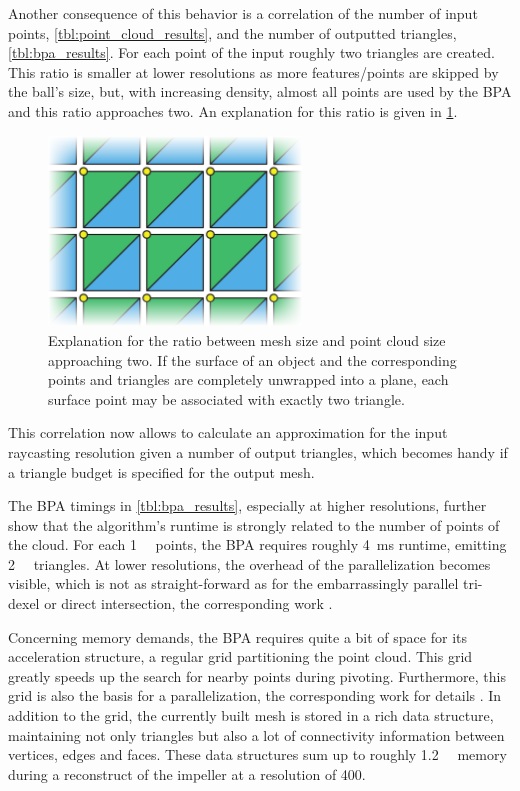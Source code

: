Another consequence of this behavior is a correlation of the number of input points, \cf \cref{tbl:point_cloud_results}, and the number of outputted triangles, \cf \cref{tbl:bpa_results}.
For each point of the input roughly two triangles are created.
This ratio is smaller at lower resolutions as more features/points are skipped by the ball's size, but, with increasing density, almost all points are used by the BPA and this ratio approaches two.
An explanation for this ratio is given in \cref{fig:bpa_point_triangle_ratio}.
%
\begin{figure}
	\centering
	\includegraphics[width=0.6\textwidth]{images/bpa_point_triangle_ratio}
	\caption{
		Explanation for the ratio between mesh size and point cloud size approaching two.
		If the surface of an object and the corresponding points and triangles are completely unwrapped into a plane, each surface point may be associated with exactly two triangle.
	}
	\label{fig:bpa_point_triangle_ratio}
\end{figure}
%
This correlation now allows to calculate an approximation for the input raycasting resolution given a number of output triangles, which becomes handy if a triangle budget is specified for the output mesh.

The BPA timings in \cref{tbl:bpa_results}, especially at higher resolutions, further show that the algorithm's runtime is strongly related to the number of points of the cloud.
For each \SI{1}{\kilo\nothing} points, the BPA requires roughly \SI{4}{\milli\second} runtime, emitting \SI{2}{\kilo\nothing} triangles.
At lower resolutions, the overhead of the parallelization becomes visible, which is not as straight-forward as for the embarrassingly parallel tri-dexel or direct intersection, \cf the corresponding work \cite{bpa_vml}.

Concerning memory demands, the BPA requires quite a bit of space for its acceleration structure, a regular grid partitioning the point cloud.
This grid greatly speeds up the search for nearby points during pivoting.
Furthermore, this grid is also the basis for a parallelization, \cf the corresponding work for details \cite{bpa_vml}.
In addition to the grid, the currently built mesh is stored in a rich data structure, maintaining not only triangles but also a lot of connectivity information between vertices, edges and faces.
These data structures sum up to roughly \SI{1.2}{\gibi\byte} memory during a reconstruct of the impeller at a resolution of 400.

